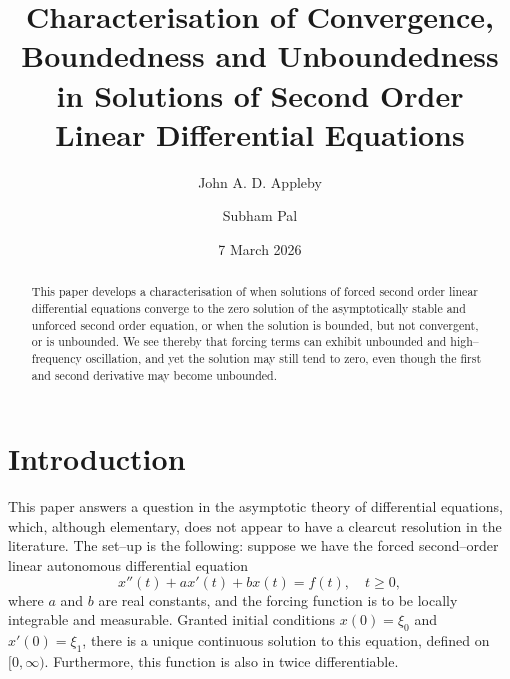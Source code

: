 \documentclass[10pt,reqno]{amsart}
\theoremstyle{definition}
\begin{document}
	\title[Asymptotics of Second order Linear ODEs]
	{Characterisation of Convergence, Boundedness and Unboundedness in Solutions of Second Order Linear Differential Equations}
	
	\author{John A. D. Appleby}
	\address{School of Mathematical
		Sciences, Dublin City University, Glasnevin, Dublin 9, Ireland}
	
	\author{Subham Pal}
	\address{School of Mathematical
		Sciences, Dublin City University, Glasnevin, Dublin 9, Ireland}
	
	\date{7 March 2026}
	
	\begin{abstract}
		This paper develops a characterisation of when solutions of forced second order linear differential equations converge to the zero solution of the asymptotically stable and unforced second order equation, or when the solution is bounded, but not convergent, or is unbounded. We see thereby that forcing terms can exhibit unbounded and high--frequency oscillation, and yet the solution may still tend to zero, even though the first and second derivative may become unbounded.  
	\end{abstract}
	
	\maketitle
	
	\section{Introduction}
	
	This paper answers a question in the asymptotic theory of differential equations, which, although elementary, does not appear to have a clearcut resolution in the literature. The set--up is the following: suppose we have the forced second--order linear autonomous differential equation 
	\begin{equation} \label{eq.x}
		x''(t) + ax'(t) + bx(t) = f(t), \quad t\geq 0,
	\end{equation}
	where $a$ and $b$ are real constants, and the forcing function is to be locally integrable and measurable. Granted initial conditions $x(0)=\xi_0$ and $x'(0)=\xi_1$, there is a unique continuous solution to this equation, defined on $[0,\infty)$. Furthermore, this function is also in twice differentiable.  
	
\end{document}
